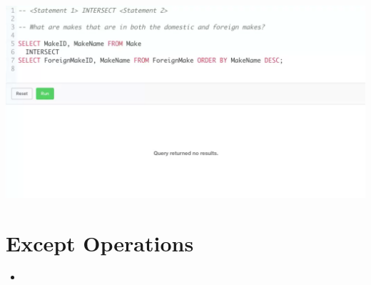 \documentclass[12pt]{article}
\begin{document}
\begin{itemize}
    \begin{center}
    \includegraphics[width=\linewidth]{images/part_5_notes_5.png}
    \end{center}
\end{itemize}

\bigskip

\section{Except Operations}

\bigskip

\begin{itemize}
    \item
\end{itemize}
\end{document}
